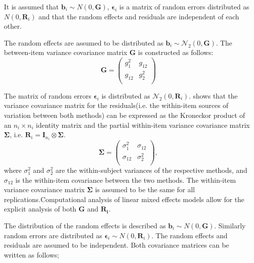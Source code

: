 \documentclass[12pt, a4paper]{report}
\theoremstyle{plain}
\theoremstyle{definition}
\theoremstyle{remark}
\begin{document}
It is assumed that $\boldsymbol{b}_i \sim N(0,\boldsymbol{G})$, $\boldsymbol{\epsilon}_i$ is a matrix of random errors distributed as $N(0,\boldsymbol{R}_i)$ and that the random effects and residuals are independent of each other.

The random effects are assumed to be distributed as $\boldsymbol{b}_i \sim \mathcal{N}_2(0,\boldsymbol{G})$. The between-item variance covariance matrix $\boldsymbol{G}$ is constructed as follows:
\[ \boldsymbol{G} =\left(
\begin{array}{cc}
g^2_1  & g_{12} \\
g_{12} & g^2_2 \\
\end{array}
\right) \]

The matrix of random errors $\boldsymbol{\epsilon}_i$ is distributed as $\mathcal{N}_2(0,\boldsymbol{R}_i)$.
\citet{hamlett} shows that the variance covariance matrix for the residuals(i.e. the within-item sources of variation between both methods) can be expressed as the Kroneckor product of an $n_i \times n_i$ identity matrix and the partial within-item variance covariance matrix $\boldsymbol{\Sigma}$, i.e. $\boldsymbol{R}_{i} = \boldsymbol{I}_{n_{i}} \otimes \boldsymbol{\Sigma}$.
\[
\boldsymbol{\Sigma} = \left( \begin{array}{cc}
\sigma^2_{1} & \sigma_{12} \\
\sigma_{12} & \sigma^2_{2} \\
\end{array}\right),
\]
where $\sigma^2_{1}$ and $\sigma^2_{2}$ are the within-subject variances of the respective methods, and $\sigma_{12}$ is the within-item covariance between the two methods. The within-item variance covariance matrix $\boldsymbol{\Sigma}$ is assumed to be the same for all replications.Computational analysis of linear mixed effects models allow for the explicit analysis of both $\boldsymbol{G}$ and $\boldsymbol{R_i}$.


The distribution of the random effects is described as $\boldsymbol{b}_i \sim N(0,\boldsymbol{G})$. Similarly  random errors are distributed as $\boldsymbol{\epsilon}_i \sim N(0,\boldsymbol{R}_i)$. The random effects and residuals are assumed to be independent. Both covariance matrices can be written as follows;
\end{document}
